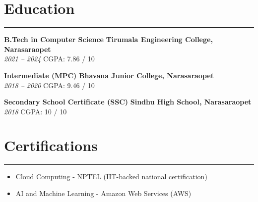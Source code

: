 \documentclass[10pt]{article}
\begin{document}
\section*{Education}
\vspace{1pt}\hrule\vspace{4pt}
\textbf{B.Tech in Computer Science} \hfill \textbf{Tirumala Engineering College, Narasaraopet} \\
\textit{2021 -- 2024} \quad CGPA: 7.86 / 10

\textbf{Intermediate (MPC)} \hfill \textbf{Bhavana Junior College, Narasaraopet} \\
\textit{2018 -- 2020} \quad CGPA: 9.46 / 10

\textbf{Secondary School Certificate (SSC)} \hfill \textbf{Sindhu High School, Narasaraopet} \\
\textit{2018} \quad CGPA: 10 / 10

\section*{Certifications}
\vspace{1pt}\hrule\vspace{4pt}
\begin{itemize}
  \item Cloud Computing - NPTEL (IIT-backed national certification)
  \item AI and Machine Learning - Amazon Web Services (AWS)
\end{itemize}
\end{document}

